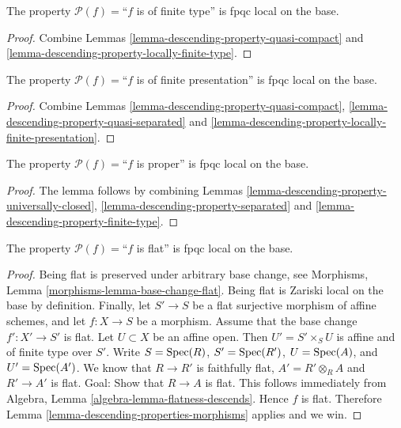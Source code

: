 \begin{lemma}
\label{lemma-descending-property-finite-type}
The property $\mathcal{P}(f) =$``$f$ is of finite type''
is fpqc local on the base.
\end{lemma}

\begin{proof}
Combine Lemmas \ref{lemma-descending-property-quasi-compact}
and \ref{lemma-descending-property-locally-finite-type}.
\end{proof}

\begin{lemma}
\label{lemma-descending-property-finite-presentation}
The property $\mathcal{P}(f) =$``$f$ is of finite presentation''
is fpqc local on the base.
\end{lemma}

\begin{proof}
Combine Lemmas \ref{lemma-descending-property-quasi-compact},
\ref{lemma-descending-property-quasi-separated} and
\ref{lemma-descending-property-locally-finite-presentation}.
\end{proof}

\begin{lemma}
\label{lemma-descending-property-proper}
The property $\mathcal{P}(f) =$``$f$ is proper''
is fpqc local on the base.
\end{lemma}

\begin{proof}
The lemma follows by combining
Lemmas \ref{lemma-descending-property-universally-closed},
\ref{lemma-descending-property-separated}
and \ref{lemma-descending-property-finite-type}.
\end{proof}

\begin{lemma}
\label{lemma-descending-property-flat}
The property $\mathcal{P}(f) =$``$f$ is flat''
is fpqc local on the base.
\end{lemma}

\begin{proof}
Being flat is preserved under arbitrary base change, see
Morphisms, Lemma \ref{morphisms-lemma-base-change-flat}.
Being flat is Zariski local on the base by definition.
Finally, let
$S' \to S$ be a flat surjective morphism of affine schemes,
and let $f : X \to S$ be a morphism. Assume that the base change
$f' : X' \to S'$ is flat.
Let $U \subset X$ be an affine open. Then $U' = S' \times_S U$
is affine and of finite type over $S'$. Write
$S = \mathop{\rm Spec}(R)$,
$S' = \mathop{\rm Spec}(R')$,
$U = \mathop{\rm Spec}(A)$, and
$U' = \mathop{\rm Spec}(A')$.
We know that $R \to R'$ is faithfully flat,
$A' = R' \otimes_R A$ and $R' \to A'$ is flat.
Goal: Show that $R \to A$ is flat.
This follows immediately from
Algebra, Lemma \ref{algebra-lemma-flatness-descends}.
Hence $f$ is flat.
Therefore Lemma \ref{lemma-descending-properties-morphisms} applies and we win.
\end{proof}

